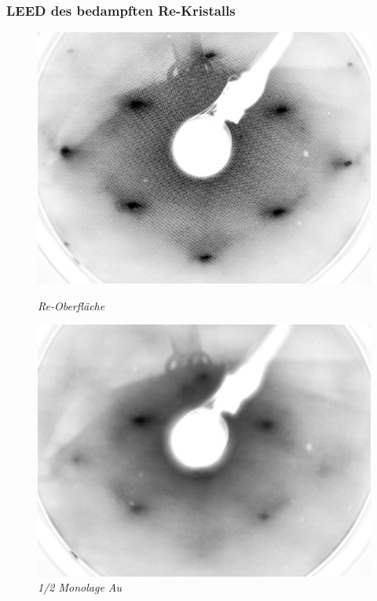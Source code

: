 \documentclass{beamer}
\begin{document}
\begin{frame}
\frametitle{LEED des bedampften Re-Kristalls}
\begin{minipage}{\linewidth}
\begin{figure}[H]
		\captionsetup{name=Abb.}
	\begin{minipage}[b]{0.3\textwidth} 
		\includegraphics[width=\textwidth]{bilder/unbedampft_E207}
		\caption*{\textit{Re-Oberfläche}}
		\label{0ML} 
	\end{minipage}
	\hfill
	\begin{minipage}[b]{0.3\textwidth}
		\includegraphics[width=\textwidth]{bilder/0_5ML_E208}
		\caption*{\textit{1/2 Monolage Au}}

\end{minipage}
\end{figure}
\end{minipage}
\end{frame}
\end{document}
